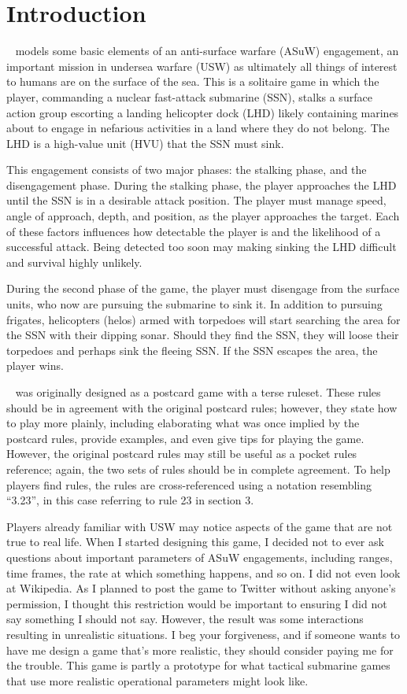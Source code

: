 \documentclass[../TacSubGameRules.tex]{subfiles}
\begin{document}
\section*{Introduction}

\gametitle~ models some basic elements of an anti-surface warfare (ASuW) engagement, an important mission in undersea warfare (USW) as ultimately all things of interest to humans are on the surface of the sea.
This is a solitaire game in which the player, commanding a nuclear fast-attack submarine (SSN), stalks a surface action group escorting a landing helicopter dock (LHD) likely containing marines about to engage in nefarious activities in a land where they do not belong.
The LHD is a high-value unit (HVU) that the SSN must sink.

This engagement consists of two major phases: the stalking phase, and the disengagement phase.
During the stalking phase, the player approaches the LHD until the SSN is in a desirable attack position.
The player must manage speed, angle of approach, depth, and position, as the player approaches the target.
Each of these factors influences how detectable the player is and the likelihood of a successful attack.
Being detected too soon may making sinking the LHD difficult and survival highly unlikely.

During the second phase of the game, the player must disengage from the surface units, who now are pursuing the submarine to sink it.
In addition to pursuing frigates, helicopters (helos) armed with torpedoes will start searching the area for the SSN with their dipping sonar.
Should they find the SSN, they will loose their torpedoes and perhaps sink the fleeing SSN.
If the SSN escapes the area, the player wins.

\gametitle~ was originally designed as a postcard game with a terse ruleset.
These rules should be in agreement with the original postcard rules; however, they state how to play more plainly, including elaborating what was once implied by the postcard rules, provide examples, and even give tips for playing the game.
However, the original postcard rules may still be useful as a pocket rules reference; again, the two sets of rules should be in complete agreement.
To help players find rules, the rules are cross-referenced using a notation resembling ``3.23'', in this case referring to rule 23 in section 3.

Players already familiar with USW may notice aspects of the game that are not true to real life.
When I started designing this game, I decided not to ever ask questions about important parameters of ASuW engagements, including ranges, time frames, the rate at which something happens, and so on.
I did not even look at Wikipedia.
As I planned to post the game to Twitter without asking anyone's permission, I thought this restriction would be important to ensuring I did not say something I should not say.
However, the result was some interactions resulting in unrealistic situations.
I beg your forgiveness, and if someone wants to have me design a game that's more realistic, they should consider paying me for the trouble.
This game is partly a prototype for what tactical submarine games that use more realistic operational parameters might look like.
\end{document}
